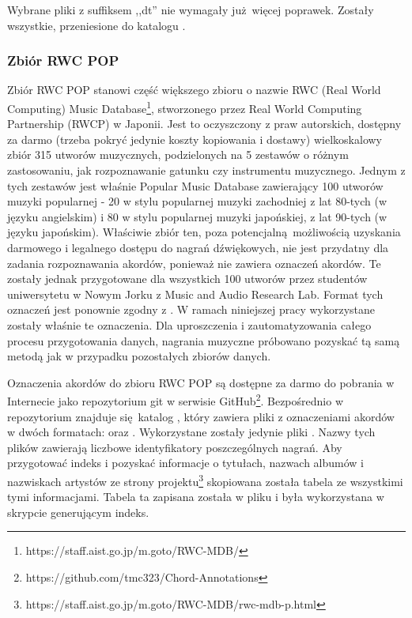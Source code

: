 Wybrane pliki z suffiksem ,,dt'' nie wymagały już więcej poprawek. Zostały wszystkie, przeniesione
do katalogu .

\subsubsection{Zbiór RWC POP}

Zbiór RWC POP \cite{goto_rwc_nodate} stanowi część większego zbioru o nazwie RWC (Real World
Computing) Music Database\footnote{https://staff.aist.go.jp/m.goto/RWC-MDB/}, stworzonego przez Real
World Computing Partnership (RWCP) w Japonii. Jest to oczyszczony z praw autorskich, dostępny za
darmo (trzeba pokryć jedynie koszty kopiowania i dostawy) wielkoskalowy zbiór 315 utworów
muzycznych, podzielonych na 5 zestawów o różnym zastosowaniu, jak rozpoznawanie gatunku czy
instrumentu muzycznego. Jednym z tych zestawów jest właśnie Popular Music Database zawierający 100
utworów muzyki popularnej - 20 w stylu popularnej muzyki zachodniej z lat 80-tych (w języku
angielskim) i 80 w stylu popularnej muzyki japońskiej, z lat 90-tych (w języku japońskim). Właściwie
zbiór ten, poza potencjalną możliwością uzyskania darmowego i legalnego dostępu do nagrań
dźwiękowych, nie jest przydatny dla zadania rozpoznawania akordów, ponieważ nie zawiera oznaczeń
akordów. Te zostały jednak przygotowane dla wszystkich 100 utworów przez studentów uniwersytetu w
Nowym Jorku z Music and Audio Research Lab. Format tych oznaczeń jest ponownie zgodny z
\cite{harte_towards_nodate}. W ramach niniejszej pracy wykorzystane zostały właśnie te oznaczenia.
Dla uproszczenia i zautomatyzowania całego procesu przygotowania danych, nagrania muzyczne próbowano
pozyskać tą samą metodą jak w przypadku pozostałych zbiorów danych.

Oznaczenia akordów do zbioru RWC POP są dostępne za darmo do pobrania w Internecie jako repozytorium
git w serwisie GitHub\footnote{https://github.com/tmc323/Chord-Annotations}. Bezpośrednio w
repozytorium znajduje się katalog , który zawiera pliki z oznaczeniami akordów w
dwóch formatach:  oraz . Wykorzystane zostały jedynie pliki . Nazwy
tych plików zawierają liczbowe identyfikatory poszczególnych nagrań. Aby przygotować indeks i
pozyskać informacje o tytułach, nazwach albumów i nazwiskach artystów ze strony
projektu\footnote{https://staff.aist.go.jp/m.goto/RWC-MDB/rwc-mdb-p.html} skopiowana została tabela
ze wszystkimi tymi informacjami. Tabela ta zapisana została w pliku
 i była wykorzystana w skrypcie generującym indeks.

